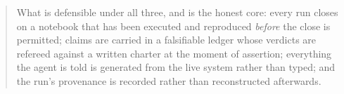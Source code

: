 \begin{abstract}

What is defensible under all three, and is the honest core: every run closes on
a notebook that has been executed and reproduced \emph{before} the close is
permitted; claims are carried in a falsifiable ledger whose verdicts are
refereed against a written charter at the moment of assertion; everything the
agent is told is generated from the live system rather than typed; and the
run's provenance is recorded rather than reconstructed afterwards.
\end{abstract}
